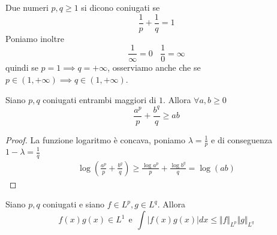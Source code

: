 \begin{defn}
Due numeri $p, q \geq 1$ si dicono coniugati se
\begin{equation*}
\frac{1}{p} + \frac{1}{q} = 1
\end{equation*}
Poniamo inoltre
\begin{equation*}
\frac{1}{\infty} = 0\ \ \ \ \frac{1}{0} = \infty
\end{equation*}
quindi se $p = 1\implies q = + \infty $, osserviamo anche che se $p\in (1, + \infty) \implies q\in (1, + \infty)$.
\end{defn}
\begin{thm}
Siano $p, q$ coniugati entrambi maggiori di $1$. Allora $\forall a, b \geq 0$
\begin{equation*}
\frac{a^{p}}{p} + \frac{b^{q}}{q} \geq ab
\end{equation*}
\end{thm}
\begin{proof}

La funzione logaritmo è concava, poniamo $\lambda = \frac{1}{p}$ e di conseguenza $1 - \lambda = \frac{1}{q}$
\begin{gather*}
\log\left(\frac{a^{p}}{p} + \frac{b^{q}}{q}\right) \geq \frac{\log a^{p}}{p} + \frac{\log b^{q}}{q} = \log(ab)
\end{gather*}
\end{proof}
\begin{thm}
Siano $p, q$ coniugati e siano $f\in L^{p}, g\in L^{q}$. Allora
\begin{equation*}
f(x) g(x) \in L^{1} \ \ \text{e} \ \ \int | f(x) g(x)| dx \leq \Vert f \Vert_{L^{p}} \Vert g \Vert_{L^{q}}
\end{equation*}
\end{thm}
